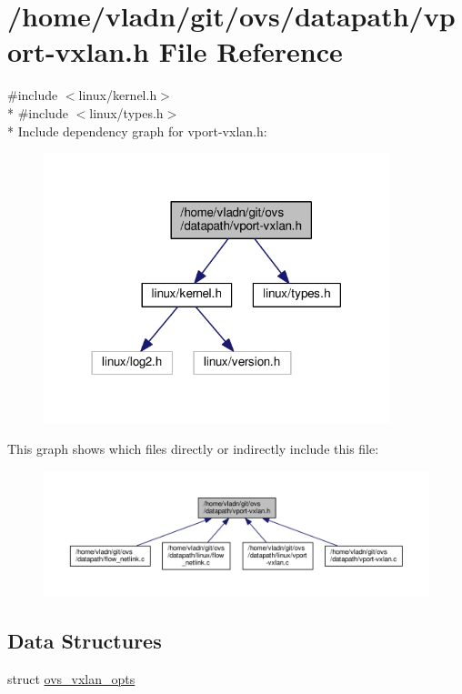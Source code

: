 \hypertarget{vport-vxlan_8h}{}\section{/home/vladn/git/ovs/datapath/vport-\/vxlan.h File Reference}
\label{vport-vxlan_8h}
{\ttfamily \#include $<$linux/kernel.\+h$>$}\\*
{\ttfamily \#include $<$linux/types.\+h$>$}\\*
Include dependency graph for vport-\/vxlan.h\+:
\nopagebreak
\begin{figure}[H]
\begin{center}
\leavevmode
\includegraphics[width=285pt]{vport-vxlan_8h__incl}
\end{center}
\end{figure}
This graph shows which files directly or indirectly include this file\+:
\nopagebreak
\begin{figure}[H]
\begin{center}
\leavevmode
\includegraphics[width=350pt]{vport-vxlan_8h__dep__incl}
\end{center}
\end{figure}
\subsection*{Data Structures}
\begin{DoxyCompactItemize}
\item 
struct \hyperlink{structovs__vxlan__opts}{ovs\+\_\+vxlan\+\_\+opts}
\end{DoxyCompactItemize}
